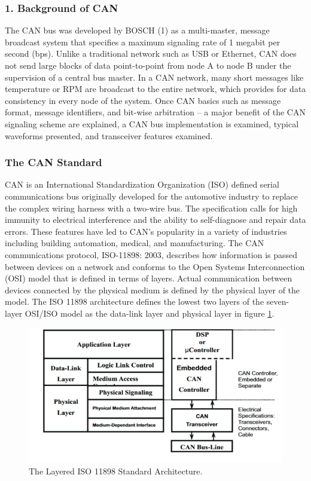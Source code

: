 \subsubsection{1. Background of CAN}
The CAN bus was developed by BOSCH (1) as a multi-master, message broadcast system that specifies a maximum signaling rate of 1 megabit per second (bps). Unlike a traditional network such as USB or Ethernet, CAN does not send large blocks of data point-to-point from node A to node B under the supervision of a central bus master. In a CAN network, many short messages like temperature or RPM are broadcast to the entire network, which provides for data consistency in every node of the system. Once CAN basics such as message format, message identifiers, and bit-wise arbitration -- a major benefit of the CAN signaling scheme are explained, a CAN bus implementation is examined, typical waveforms presented, and transceiver features examined.

\subsubsection{The CAN Standard}
CAN is an International Standardization Organization (ISO) defined serial communications bus originally developed for the automotive industry to replace the complex wiring harness with a two-wire bus. The specification calls for high immunity to electrical interference and the ability to self-diagnose and repair data errors. These features have led to CAN’s popularity in a variety of industries including building automation, medical, and manufacturing. The CAN communications protocol, ISO-11898: 2003, describes how information is passed between devices on a network and conforms to the Open Systems Interconnection (OSI) model that is defined in terms of layers. Actual communication between devices connected by the physical medium is defined by the physical layer of the model. The ISO 11898 architecture defines the lowest two layers of the seven-layer OSI/ISO model as the data-link layer and physical layer in figure \ref{fig:iso-standard}.

\begin{figure}[h]
   \centering
    \includegraphics[width=\textwidth]{figure/3_10.png}
    \caption{The Layered ISO 11898 Standard Architecture. }
    \label{fig:iso-standard}
\end{figure}

